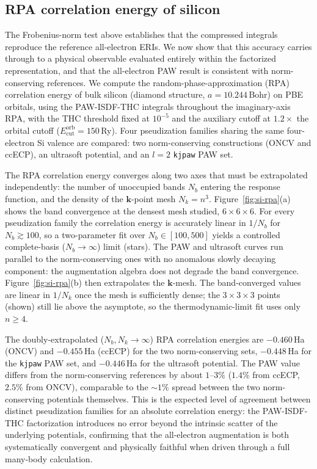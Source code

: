 \documentclass[aps,prb,reprint,superscriptaddress,longbibliography,nofootinbib]{revtex4-2}
\newcommand{\bk}{\mathbf k}
\newcommand{\orb}{\mathrm{orb}}
\begin{document}
\subsection{RPA correlation energy of silicon}
\label{sec:numerics-rpa}

The Frobenius-norm test above establishes that the compressed integrals
reproduce the reference all-electron ERIs.  We now show that this accuracy
carries through to a physical observable evaluated entirely within the
factorized representation, and that the all-electron PAW result is consistent
with norm-conserving references.  We compute the random-phase-approximation
(RPA) correlation energy of bulk silicon (diamond structure,
\(a=10.244\,\)Bohr) on PBE orbitals, using the PAW-ISDF-THC integrals
throughout the imaginary-axis RPA, with the THC threshold fixed at \(10^{-5}\)
and the auxiliary cutoff at \(1.2\times\) the orbital cutoff
(\(E_{\mathrm{cut}}^{\orb}=150\,\)Ry).  Four pseudization families sharing the
same four-electron Si valence are compared: two norm-conserving constructions
(ONCV and ccECP), an ultrasoft potential, and an \(l=2\) \texttt{kjpaw} PAW set.

The RPA correlation energy converges along two axes that must be extrapolated
independently: the number of unoccupied bands \(N_b\) entering the response
function, and the density of the \(\bk\)-point mesh \(N_k=n^3\).
Figure~\ref{fig:si-rpa}(a) shows the band convergence at the densest mesh
studied, \(6\times6\times6\).  For every pseudization family the correlation
energy is accurately linear in \(1/N_b\) for \(N_b\gtrsim100\), so a
two-parameter fit over \(N_b\in[100,500]\) yields a controlled
complete-basis (\(N_b\to\infty\)) limit (stars).  The PAW and ultrasoft curves
run parallel to the norm-conserving ones with no anomalous slowly decaying
component: the augmentation algebra does not degrade the band convergence.
Figure~\ref{fig:si-rpa}(b) then extrapolates the \(\bk\)-mesh.  The
band-converged values are linear in \(1/N_k\) once the mesh is sufficiently
dense; the \(3\times3\times3\) points (shown) still lie above the asymptote, so
the thermodynamic-limit fit uses only \(n\geq4\).

The doubly-extrapolated (\(N_b,N_k\to\infty\)) RPA correlation energies are
\(-0.460\,\)Ha (ONCV) and \(-0.455\,\)Ha (ccECP) for the two norm-conserving
sets, \(-0.448\,\)Ha for the \texttt{kjpaw} PAW set, and \(-0.446\,\)Ha for the
ultrasoft potential.  The PAW value differs from the norm-conserving references
by about \(1\)--\(3\%\) (\(1.4\%\) from ccECP, \(2.5\%\) from ONCV), comparable
to the \(\sim\!1\%\) spread between the two norm-conserving potentials
themselves.  This is the expected level of agreement between distinct
pseudization families for an absolute correlation energy: the PAW-ISDF-THC
factorization introduces no error beyond the intrinsic scatter of the
underlying potentials, confirming that the all-electron augmentation is both
systematically convergent and physically faithful when driven through a full
many-body calculation.
\end{document}
